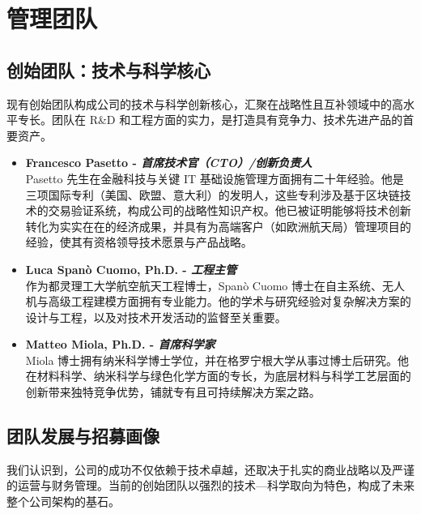 \documentclass[11pt, a4paper, oneside]{article}
\begin{document}
\newpage
\section{管理团队}

\subsection{创始团队：技术与科学核心}

现有创始团队构成公司的技术与科学创新核心，汇聚在战略性且互补领域中的高水平专长。团队在 R\&D 和工程方面的实力，是打造具有竞争力、技术先进产品的首要资产。

\begin{itemize}
    \item \textbf{Francesco Pasetto - \textit{首席技术官（CTO）/创新负责人}} \\
    Pasetto 先生在金融科技与关键 IT 基础设施管理方面拥有二十年经验。他是三项国际专利（美国、欧盟、意大利）的发明人，这些专利涉及基于区块链技术的交易验证系统，构成公司的战略性知识产权。他已被证明能够将技术创新转化为实实在在的经济成果，并具有为高端客户（如欧洲航天局）管理项目的经验，使其有资格领导技术愿景与产品战略。

    \item \textbf{Luca Spanò Cuomo, Ph.D. - \textit{工程主管}} \\
    作为都灵理工大学航空航天工程博士，Spanò Cuomo 博士在自主系统、无人机与高级工程建模方面拥有专业能力。他的学术与研究经验对复杂解决方案的设计与工程，以及对技术开发活动的监督至关重要。

    \item \textbf{Matteo Miola, Ph.D. - \textit{首席科学家}} \\
    Miola 博士拥有纳米科学博士学位，并在格罗宁根大学从事过博士后研究。他在材料科学、纳米科学与绿色化学方面的专长，为底层材料与科学工艺层面的创新带来独特竞争优势，铺就专有且可持续解决方案之路。
\end{itemize}



\subsection{团队发展与招募画像}

我们认识到，公司的成功不仅依赖于技术卓越，还取决于扎实的商业战略以及严谨的运营与财务管理。当前的创始团队以强烈的技术—科学取向为特色，构成了未来整个公司架构的基石。
\end{document}
